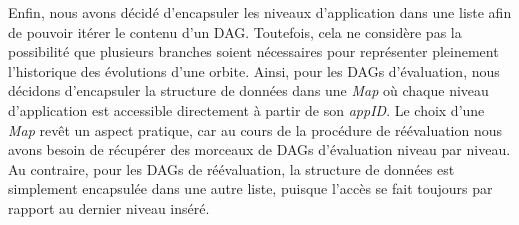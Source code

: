 Enfin, nous avons décidé d'encapsuler les niveaux d'application dans une liste
afin de pouvoir itérer le contenu d'un DAG. %
Toutefois, cela ne considère pas la possibilité que plusieurs branches soient
nécessaires pour représenter pleinement l'historique des évolutions d'une
orbite. %
Ainsi, pour les DAGs d'évaluation, nous décidons d'encapsuler la structure de
données dans une \textit{Map} où chaque niveau d'application est accessible
directement à partir de son \textit{appID}. %
Le choix d'une \textit{Map} revêt un aspect pratique, car au cours de la
procédure de réévaluation nous avons besoin de récupérer des morceaux de DAGs
d'évaluation niveau par niveau. %
Au contraire, pour les DAGs de réévaluation, la structure de données est
simplement encapsulée dans une autre liste, puisque l'accès se fait toujours par
rapport au dernier niveau inséré. %


